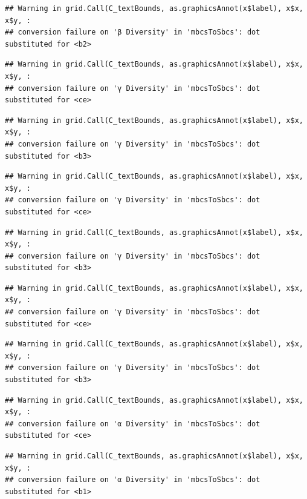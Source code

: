 \documentclass[
]{article}
\begin{document}
\begin{verbatim}
## Warning in grid.Call(C_textBounds, as.graphicsAnnot(x$label), x$x, x$y, :
## conversion failure on 'β Diversity' in 'mbcsToSbcs': dot substituted for <b2>
\end{verbatim}

\begin{verbatim}
## Warning in grid.Call(C_textBounds, as.graphicsAnnot(x$label), x$x, x$y, :
## conversion failure on 'γ Diversity' in 'mbcsToSbcs': dot substituted for <ce>
\end{verbatim}

\begin{verbatim}
## Warning in grid.Call(C_textBounds, as.graphicsAnnot(x$label), x$x, x$y, :
## conversion failure on 'γ Diversity' in 'mbcsToSbcs': dot substituted for <b3>
\end{verbatim}

\begin{verbatim}
## Warning in grid.Call(C_textBounds, as.graphicsAnnot(x$label), x$x, x$y, :
## conversion failure on 'γ Diversity' in 'mbcsToSbcs': dot substituted for <ce>
\end{verbatim}

\begin{verbatim}
## Warning in grid.Call(C_textBounds, as.graphicsAnnot(x$label), x$x, x$y, :
## conversion failure on 'γ Diversity' in 'mbcsToSbcs': dot substituted for <b3>
\end{verbatim}

\begin{verbatim}
## Warning in grid.Call(C_textBounds, as.graphicsAnnot(x$label), x$x, x$y, :
## conversion failure on 'γ Diversity' in 'mbcsToSbcs': dot substituted for <ce>
\end{verbatim}

\begin{verbatim}
## Warning in grid.Call(C_textBounds, as.graphicsAnnot(x$label), x$x, x$y, :
## conversion failure on 'γ Diversity' in 'mbcsToSbcs': dot substituted for <b3>
\end{verbatim}

\begin{verbatim}
## Warning in grid.Call(C_textBounds, as.graphicsAnnot(x$label), x$x, x$y, :
## conversion failure on 'α Diversity' in 'mbcsToSbcs': dot substituted for <ce>
\end{verbatim}

\begin{verbatim}
## Warning in grid.Call(C_textBounds, as.graphicsAnnot(x$label), x$x, x$y, :
## conversion failure on 'α Diversity' in 'mbcsToSbcs': dot substituted for <b1>
\end{verbatim}
\end{document}

